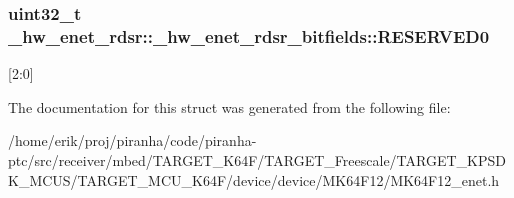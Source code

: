\subsubsection[{\texorpdfstring{R\+E\+S\+E\+R\+V\+E\+D0}{RESERVED0}}]{\setlength{\rightskip}{0pt plus 5cm}uint32\+\_\+t \+\_\+hw\+\_\+enet\+\_\+rdsr\+::\+\_\+hw\+\_\+enet\+\_\+rdsr\+\_\+bitfields\+::\+R\+E\+S\+E\+R\+V\+E\+D0}\hypertarget{struct__hw__enet__rdsr_1_1__hw__enet__rdsr__bitfields_ae21aff1aca93aba67db76894b95aadd5}{}\label{struct__hw__enet__rdsr_1_1__hw__enet__rdsr__bitfields_ae21aff1aca93aba67db76894b95aadd5}
\mbox{[}2\+:0\mbox{]} 

The documentation for this struct was generated from the following file\+:\begin{DoxyCompactItemize}
\item 
/home/erik/proj/piranha/code/piranha-\/ptc/src/receiver/mbed/\+T\+A\+R\+G\+E\+T\+\_\+\+K64\+F/\+T\+A\+R\+G\+E\+T\+\_\+\+Freescale/\+T\+A\+R\+G\+E\+T\+\_\+\+K\+P\+S\+D\+K\+\_\+\+M\+C\+U\+S/\+T\+A\+R\+G\+E\+T\+\_\+\+M\+C\+U\+\_\+\+K64\+F/device/device/\+M\+K64\+F12/M\+K64\+F12\+\_\+enet.\+h\end{DoxyCompactItemize}
